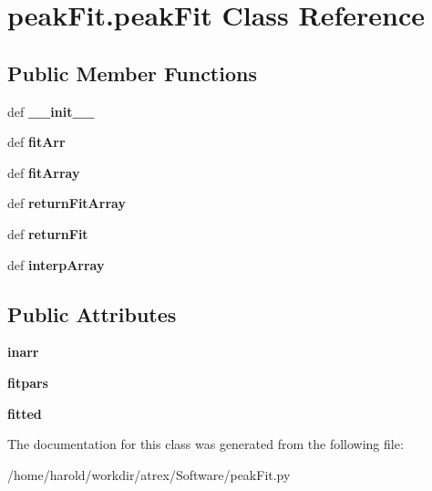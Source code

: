 \hypertarget{classpeakFit_1_1peakFit}{\section{peak\-Fit.\-peak\-Fit Class Reference}
\label{classpeakFit_1_1peakFit}
}
\subsection*{Public Member Functions}
\begin{DoxyCompactItemize}
\item 
\hypertarget{classpeakFit_1_1peakFit_a6ab39ce33c91775176e0c46cc6f936f6}{def {\bfseries \-\_\-\-\_\-init\-\_\-\-\_\-}}\label{classpeakFit_1_1peakFit_a6ab39ce33c91775176e0c46cc6f936f6}

\item 
\hypertarget{classpeakFit_1_1peakFit_a84a91a33d88ca2403a4e435b5d1f90ec}{def {\bfseries fit\-Arr}}\label{classpeakFit_1_1peakFit_a84a91a33d88ca2403a4e435b5d1f90ec}

\item 
\hypertarget{classpeakFit_1_1peakFit_a0bbfae3ae35fbad87477c06b1607362a}{def {\bfseries fit\-Array}}\label{classpeakFit_1_1peakFit_a0bbfae3ae35fbad87477c06b1607362a}

\item 
\hypertarget{classpeakFit_1_1peakFit_a4be5cc7b519e08cd3c401e44449ff06b}{def {\bfseries return\-Fit\-Array}}\label{classpeakFit_1_1peakFit_a4be5cc7b519e08cd3c401e44449ff06b}

\item 
\hypertarget{classpeakFit_1_1peakFit_ad2af816ebe4e711d783eac36caf062fd}{def {\bfseries return\-Fit}}\label{classpeakFit_1_1peakFit_ad2af816ebe4e711d783eac36caf062fd}

\item 
\hypertarget{classpeakFit_1_1peakFit_a430b52fc42d7539b1374dc4bd1b64efc}{def {\bfseries interp\-Array}}\label{classpeakFit_1_1peakFit_a430b52fc42d7539b1374dc4bd1b64efc}

\end{DoxyCompactItemize}
\subsection*{Public Attributes}
\begin{DoxyCompactItemize}
\item 
\hypertarget{classpeakFit_1_1peakFit_a46bbd242120c1eb44158673fc1ba69eb}{{\bfseries inarr}}\label{classpeakFit_1_1peakFit_a46bbd242120c1eb44158673fc1ba69eb}

\item 
\hypertarget{classpeakFit_1_1peakFit_a7bcef9f3d5dbca4a5470a53661dabe4c}{{\bfseries fitpars}}\label{classpeakFit_1_1peakFit_a7bcef9f3d5dbca4a5470a53661dabe4c}

\item 
\hypertarget{classpeakFit_1_1peakFit_a1d06c78ecd07718ae71cc50df4d0251c}{{\bfseries fitted}}\label{classpeakFit_1_1peakFit_a1d06c78ecd07718ae71cc50df4d0251c}

\end{DoxyCompactItemize}


The documentation for this class was generated from the following file\-:\begin{DoxyCompactItemize}
\item 
/home/harold/workdir/atrex/\-Software/peak\-Fit.\-py\end{DoxyCompactItemize}
